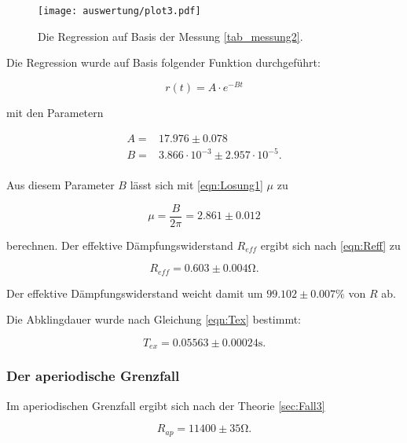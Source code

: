 \begin{figure}[H]
  \centering
  \texttt{[image: auswertung/plot3.pdf]}
  \caption{Die Regression auf Basis der Messung \ref{tab_messung2}.}
  \label{fig:regrmessung2}
\end{figure}
\noindent

Die Regression wurde auf Basis folgender Funktion durchgeführt:

\begin{equation*}
  r(t) = A \cdot e^{-B t}
\end{equation*}

mit den Parametern

\begin{align*}
  A  = & 17.976 \pm  0.078 \\
  B  = & 3.866 \cdot 10^{-3} \pm 2.957 \cdot 10^{-5}. \\
\end{align*}

Aus diesem Parameter $B$ lässt sich mit \eqref{eqn:Losung1} $\mu$ zu

\begin{equation}
  \mu = \frac{B}{2 \pi} = 2.861 \pm 0.012
  \label{eqn:mu}
\end{equation}
\noindent

berechnen.
Der effektive Dämpfungswiderstand $R_{eff}$ ergibt sich nach \eqref{eqn:Reff} zu

\begin{equation}
  R_{eff} = 0.603   \pm 0.004 \si{\ohm}.
  \label{eqn:reffauswertung}
\end{equation}
\noindent

Der effektive Dämpfungswiderstand weicht damit um $ 99.102 \pm 0.007 \si{\percent}$ von $R$ ab.

Die Abklingdauer wurde nach Gleichung \eqref{eqn:Tex} bestimmt:

\begin{equation}
  T_{ex} = 0.05563 \pm 0.00024 \si{\second}.
  \label{eqn:texauswerung}
\end{equation}
\noindent

\subsubsection{Der aperiodische Grenzfall}
Im aperiodischen Grenzfall ergibt sich nach der Theorie \ref{sec:Fall3}

\begin{equation}
  R_{ap} =  11400 \pm 35 \si{\ohm}.
  \label{eqn:rapausw1}
\end{equation}

